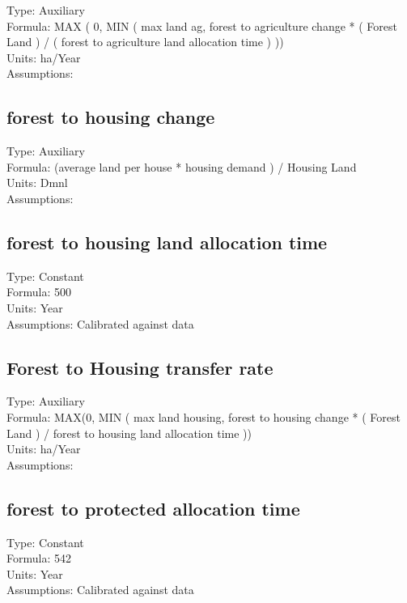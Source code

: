 \documentclass[
  11pt,
]{book}
\begin{document}
Type: Auxiliary\\
Formula: MAX ( 0, MIN ( max land ag, forest to agriculture change * ( Forest Land ) / ( forest to agriculture land allocation time ) ))\\
Units: ha/Year\\
Assumptions:

\hypertarget{forest-to-housing-change}{%
\subsection{forest to housing change}\label{forest-to-housing-change}}

Type: Auxiliary\\
Formula: (average land per house * housing demand ) / Housing Land\\
Units: Dmnl\\
Assumptions:

\hypertarget{forest-to-housing-land-allocation-time}{%
\subsection{forest to housing land allocation time}\label{forest-to-housing-land-allocation-time}}

Type: Constant\\
Formula: 500\\
Units: Year\\
Assumptions: Calibrated against data

\hypertarget{forest-to-housing-transfer-rate}{%
\subsection{Forest to Housing transfer rate}\label{forest-to-housing-transfer-rate}}

Type: Auxiliary\\
Formula: MAX(0, MIN ( max land housing, forest to housing change * ( Forest Land ) / forest to housing land allocation time ))\\
Units: ha/Year\\
Assumptions:

\hypertarget{forest-to-protected-allocation-time}{%
\subsection{forest to protected allocation time}\label{forest-to-protected-allocation-time}}

Type: Constant\\
Formula: 542\\
Units: Year\\
Assumptions: Calibrated against data
\end{document}
